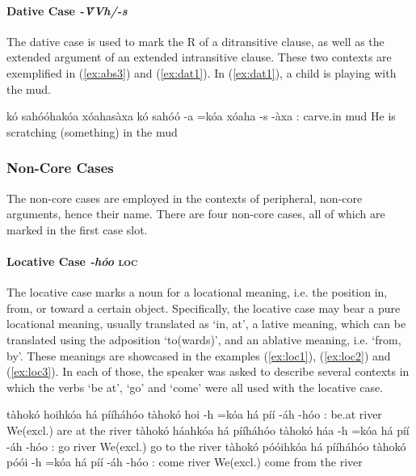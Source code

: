 \documentclass[a4paper, 12pt, oneside]{memoir}
\newcommand{\emh}[1]{\textit{#1}}
\begin{document}
\paragraph{Dative Case \emh{-V̀Vh/-s} {\Dat}}
The dative case is used to mark the R of a ditransitive clause, as well as the extended argument of an extended intransitive clause. These two contexts are exemplified in (\ref{ex:abs3}) and (\ref{ex:dat1}). In (\ref{ex:dat1}), a child is playing with the mud.
\begin{examples}
\ex \label{ex:dat1}
\words kó sahóóhakóa xóahasàxa
\bits kó sahóó -a =kóa xóaha -s -àxa
\gloss {\Tsm}:{\Subject} carve.in {\St} {\Decl} mud {\Dat} {\Ont}
\tr He is scratching (something) in the mud
\end{examples}
\subsubsection{Non-Core Cases}\label{sncorecase}
The non-core cases are employed in the contexts of peripheral, non-core arguments, hence their name. There are four non-core cases, all of which are marked in the first case slot.
\paragraph{Locative Case \emh{-hóo} \textsc{loc}}
The locative case marks a noun for a locational meaning, i.e. the position in, from, or toward a certain object. Specifically, the locative case may bear a pure locational meaning, usually translated as `in, at', a lative meaning, which can be translated using the adposition `to(wards)', and an ablative meaning, i.e. `from, by'. These meanings are showcased in the examples (\ref{ex:loc1}), (\ref{ex:loc2}) and (\ref{ex:loc3}). In each of those, the speaker was asked to describe several contexts in which the verbs `be at', `go' and `come' were all used with the locative case. 
\begin{examples}
\ex \label{ex:loc1}
\words tàhokó hoihkóa há pííháhóo
\bits tàhokó hoi -h =kóa há píí -áh -hóo
\gloss {\Fat}:{\Subject} be.at {\Ff} {\Decl} {\Cngr} river {\Aug} {\Loc}
\tr We(excl.) are at the river
\ex \label{ex:loc2}
\words tàhokó háahkóa há pííháhóo
\bits tàhokó háa -h =kóa há píí -áh -hóo
\gloss {\Fat}:{\Subject} go {\Ff} {\Decl} {\Cngr} river {\Aug} {\Loc}
\tr We(excl.) go to the river
\ex \label{ex:loc3}
\words tàhokó póóihkóa há pííháhóo
\bits tàhokó póói -h =kóa há píí -áh -hóo
\gloss {\Fat}:{\Subject} come {\Ff} {\Decl} {\Cngr} river {\Aug} {\Loc}
\tr We(excl.) come from the river
\end{examples}
\end{document}

